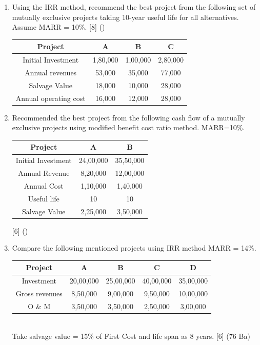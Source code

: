 \documentclass[12pt]{article}
\begin{document}
\begin{enumerate}
			\item Using the IRR method, recommend the best project from the following set of mutually exclusive projects taking 10-year useful life for all alternatives. Assume MARR = 10\%. \hfill [8] ()\\
			\begin{tabular}{|c|c|c|c|}
				\hline
				Project & A & B & C \\ \hline
				Initial Investment & 1,80,000 & 1,00,000 & 2,80,000 \\ \hline
				Annual revenues & 53,000 & 35,000 & 77,000 \\ \hline
				Salvage Value & 18,000 & 10,000 & 28,000 \\ \hline
				Annual operating cost & 16,000 & 12,000 & 28,000 \\ \hline
			\end{tabular}

			\item Recommended the best project from the following cash flow of a mutually exclusive projects using modified benefit cost ratio method. MARR=10\%. \\ 
			\begin{tabular}{|c|c|c|}
			\hline
			Project & A & B \\ \hline
			Initial Investment & 24,00,000 & 35,50,000 \\ \hline
			Annual Revenue & 8,20,000 & 12,00,000 \\ \hline
			Annual Cost & 1,10,000 & 1,40,000 \\ \hline
			Useful life & 10 & 10 \\ \hline
			Salvage Value & 2,25,000 & 3,50,000 \\ \hline
			\end{tabular} \hfill [6] ()
			
			\item Compare the following mentioned projects using IRR method MARR = 14\%. \\
			\begin{tabular}{|c|c|c|c|c|}
				\hline
				Project & A & B & C & D\\ \hline
				Investment & 20,00,000 & 25,00,000 & 40,00,000 & 35,00,000\\ \hline
				Gross revenues & 8,50,000 & 9,00,000 & 9,50,000 & 10,00,000\\ \hline
				O \& M & 3,50,000 & 3,50,000 & 2,50,000 & 3,00,000 \\ \hline
			\end{tabular}\\
			Take salvage value = 15\% of First Cost and life span as 8 years. \hfill [6] (76 Ba)
			

\end{enumerate}
\end{document}
